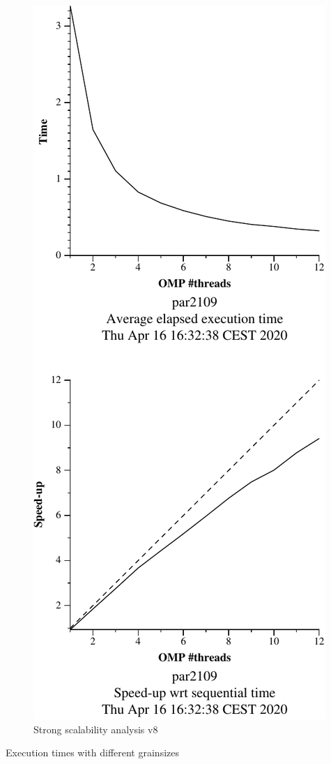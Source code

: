 \begin{figure}[H]
\begin{minipage}{0.5\textwidth}
        \includegraphics[width=0.7\linewidth]{plots/v8-crop.pdf}
        \caption{Strong scalability analysis v8}
        \label{fig:ssa_v8} 
    \end{minipage}
\end{figure}


\begin{table}[H]
    \caption{Execution times with different grainsizes}%
    \label{tab:grainsize}
    \begin{center}
    
    \end{center}
\end{table}

